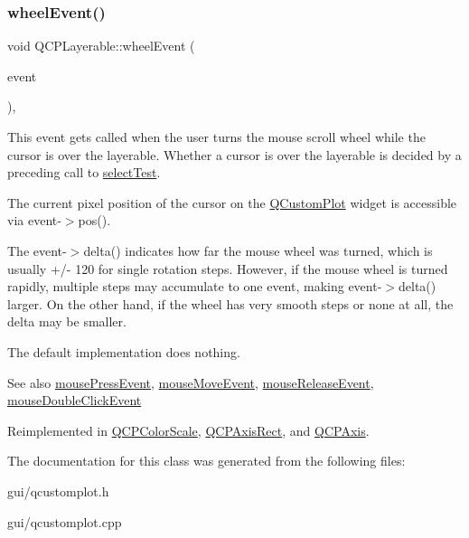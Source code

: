 \subsubsection{\texorpdfstring{wheel\+Event()}{wheelEvent()}}
{\footnotesize\ttfamily void Q\+C\+P\+Layerable\+::wheel\+Event (\begin{DoxyParamCaption}\item[{Q\+Wheel\+Event $\ast$}]{event }\end{DoxyParamCaption})\hspace{0.3cm}{\ttfamily [protected]}, {\ttfamily [virtual]}}

This event gets called when the user turns the mouse scroll wheel while the cursor is over the layerable. Whether a cursor is over the layerable is decided by a preceding call to \hyperlink{classQCPLayerable_a04db8351fefd44cfdb77958e75c6288e}{select\+Test}.

The current pixel position of the cursor on the \hyperlink{classQCustomPlot}{Q\+Custom\+Plot} widget is accessible via {\ttfamily event-\/$>$pos()}.

The {\ttfamily event-\/$>$delta()} indicates how far the mouse wheel was turned, which is usually +/-\/ 120 for single rotation steps. However, if the mouse wheel is turned rapidly, multiple steps may accumulate to one event, making {\ttfamily event-\/$>$delta()} larger. On the other hand, if the wheel has very smooth steps or none at all, the delta may be smaller.

The default implementation does nothing.

\begin{DoxySeeAlso}{See also}
\hyperlink{classQCPLayerable_af6567604818db90f4fd52822f8bc8376}{mouse\+Press\+Event}, \hyperlink{classQCPLayerable_a9eee1ba47fd69be111059ca3881933e4}{mouse\+Move\+Event}, \hyperlink{classQCPLayerable_aa0d79b005686f668622bbe66ac03ba2c}{mouse\+Release\+Event}, \hyperlink{classQCPLayerable_a4171e2e823aca242dd0279f00ed2de81}{mouse\+Double\+Click\+Event} 
\end{DoxySeeAlso}


Reimplemented in \hyperlink{classQCPColorScale_a63cf19be184f6670c9495ad3a9a1baeb}{Q\+C\+P\+Color\+Scale}, \hyperlink{classQCPAxisRect_a93eeaa0c127d6d6fe8171b2455080262}{Q\+C\+P\+Axis\+Rect}, and \hyperlink{classQCPAxis_aa850f195d7cc470c53809d0fff5e444d}{Q\+C\+P\+Axis}.



The documentation for this class was generated from the following files\+:\begin{DoxyCompactItemize}
\item 
gui/qcustomplot.\+h\item 
gui/qcustomplot.\+cpp\end{DoxyCompactItemize}
